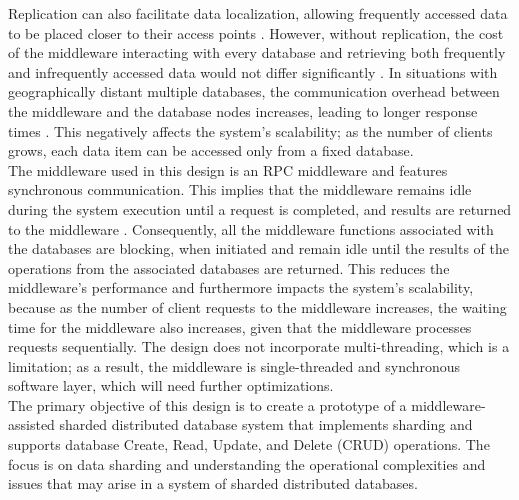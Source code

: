 \noindent Replication can also facilitate data localization, allowing frequently accessed data to be placed closer to their access points \cite{ozsu1999principles}. However, without replication, the cost of the middleware interacting with every database and retrieving both frequently and infrequently accessed data would not differ significantly \cite{9004233}. In situations with geographically distant multiple databases, the communication overhead between the middleware and the database nodes increases, leading to longer response times \cite{5635187}. This negatively affects the system's scalability; as the number of clients grows, each data item can be accessed only from a fixed database. \\

\noindent The middleware used in this design is an RPC middleware \cite{5635187} and features synchronous communication. This implies that the middleware remains idle during the system execution until a request is completed, and results are returned to the middleware \cite{ramakrishnan2003database}. Consequently, all the middleware functions associated with the databases are blocking, when initiated and remain idle until the results of the operations from the associated databases are returned. This reduces the middleware's performance and furthermore impacts the system's scalability, because as the number of client requests to the middleware increases, the waiting time for the middleware also increases, given that the middleware processes requests sequentially. The design does not incorporate multi-threading, which is a limitation; as a result, the middleware is single-threaded and synchronous software layer, which will need further optimizations. \\

\noindent The primary objective of this design is to create a prototype of a middleware-assisted sharded distributed database system that implements sharding and supports database Create, Read, Update, and Delete (CRUD) operations. The focus is on data sharding and understanding the operational complexities and issues that may arise in a system of sharded distributed databases.


